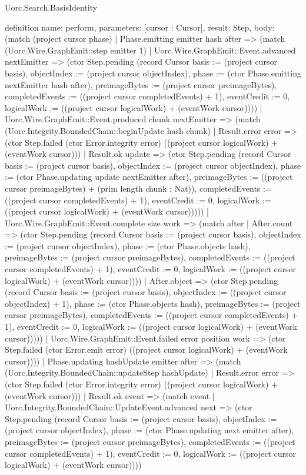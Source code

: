 \begin{lexlean}{Uorc.Search.BasisIdentity}
\begin{semanticmodule}
definition{
  name: perform,
  parameters: [cursor : Cursor],
  result: Step,
  body: (match (project cursor phase)
    | Phase.emitting emitter hash after => (match (Uorc.Wire.GraphEmit::step emitter 1)
      | Uorc.Wire.GraphEmit::Event.advanced nextEmitter => (ctor Step.pending (record Cursor {basis := (project cursor basis), objectIndex := (project cursor objectIndex), phase := (ctor Phase.emitting nextEmitter hash after), preimageBytes := (project cursor preimageBytes), completedEvents := ((project cursor completedEvents) + 1), eventCredit := 0, logicalWork := ((project cursor logicalWork) + (eventWork cursor))}))
      | Uorc.Wire.GraphEmit::Event.produced chunk nextEmitter => (match (Uorc.Integrity.BoundedChain::beginUpdate hash chunk)
        | Result.error error => (ctor Step.failed (ctor Error.integrity error) ((project cursor logicalWork) + (eventWork cursor)))
        | Result.ok update => (ctor Step.pending (record Cursor {basis := (project cursor basis), objectIndex := (project cursor objectIndex), phase := (ctor Phase.updating update nextEmitter after), preimageBytes := ((project cursor preimageBytes) + (prim length chunk : Nat)), completedEvents := ((project cursor completedEvents) + 1), eventCredit := 0, logicalWork := ((project cursor logicalWork) + (eventWork cursor))})))
      | Uorc.Wire.GraphEmit::Event.complete size work => (match after
        | After.count => (ctor Step.pending (record Cursor {basis := (project cursor basis), objectIndex := (project cursor objectIndex), phase := (ctor Phase.objects hash), preimageBytes := (project cursor preimageBytes), completedEvents := ((project cursor completedEvents) + 1), eventCredit := 0, logicalWork := ((project cursor logicalWork) + (eventWork cursor))}))
        | After.object => (ctor Step.pending (record Cursor {basis := (project cursor basis), objectIndex := ((project cursor objectIndex) + 1), phase := (ctor Phase.objects hash), preimageBytes := (project cursor preimageBytes), completedEvents := ((project cursor completedEvents) + 1), eventCredit := 0, logicalWork := ((project cursor logicalWork) + (eventWork cursor))})))
      | Uorc.Wire.GraphEmit::Event.failed error position work => (ctor Step.failed (ctor Error.emit error) ((project cursor logicalWork) + (eventWork cursor))))
    | Phase.updating hashUpdate emitter after => (match (Uorc.Integrity.BoundedChain::updateStep hashUpdate)
      | Result.error error => (ctor Step.failed (ctor Error.integrity error) ((project cursor logicalWork) + (eventWork cursor)))
      | Result.ok event => (match event
        | Uorc.Integrity.BoundedChain::UpdateEvent.advanced next => (ctor Step.pending (record Cursor {basis := (project cursor basis), objectIndex := (project cursor objectIndex), phase := (ctor Phase.updating next emitter after), preimageBytes := (project cursor preimageBytes), completedEvents := ((project cursor completedEvents) + 1), eventCredit := 0, logicalWork := ((project cursor logicalWork) + (eventWork cursor))}))
}
\end{semanticmodule}
\end{lexlean}
